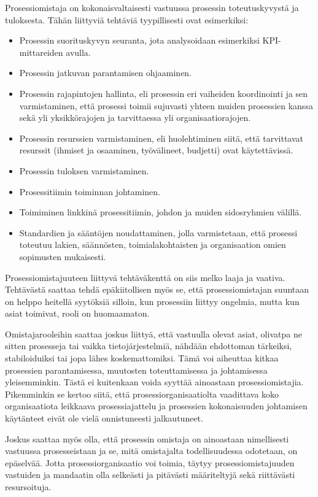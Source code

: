 \documentclass[
  finnish,
  letterpaper,
  DIV=11,
  numbers=noendperiod,
  oneside]{scrreprt}
\providecommand{\tightlist}{%
  \setlength{\itemsep}{0pt}\setlength{\parskip}{0pt}}
\begin{document}
Prosessiomistaja on kokonaisvaltaisesti vastuussa prosessin
toteutuskyvystä ja tuloksesta. Tähän liittyviä tehtäviä tyypillisesti
ovat esimerkiksi:

\begin{itemize}
\tightlist
\item
  Prosessin suorituskyvyn seuranta, jota analysoidaan esimerkiksi
  KPI-mittareiden avulla.
\item
  Prosessin jatkuvan parantamisen ohjaaminen.
\item
  Prosessin rajapintojen hallinta, eli prosessin eri vaiheiden
  koordinointi ja sen varmistaminen, että prosessi toimii sujuvasti
  yhteen muiden prosessien kanssa sekä yli yksikkörajojen ja
  tarvittaessa yli organisaatiorajojen.
\item
  Prosessin resurssien varmistaminen, eli huolehtiminen siitä, että
  tarvittavat resurssit (ihmiset ja osaaminen, työvälineet, budjetti)
  ovat käytettävissä.
\item
  Prosessin tuloksen varmistaminen.
\item
  Prosessitiimin toiminnan johtaminen.
\item
  Toimiminen linkkinä prosessitiimin, johdon ja muiden sidosryhmien
  välillä.
\item
  Standardien ja sääntöjen noudattaminen, jolla varmistetaan, että
  prosessi toteutuu lakien, säännösten, toimialakohtaisten ja
  organisaation omien sopimusten mukaisesti.
\end{itemize}

Prosessiomistajuuteen liittyvä tehtäväkenttä on siis melko laaja ja
vaativa. Tehtävästä saattaa tehdä epäkiitollisen myös se, että
prosessiomistajan suuntaan on helppo heitellä syytöksiä silloin, kun
prosessiin liittyy ongelmia, mutta kun asiat toimivat, rooli on
huomaamaton.

Omistajarooleihin saattaa joskus liittyä, että vastuulla olevat asiat,
olivatpa ne sitten prosesseja tai vaikka tietojärjestelmiä, nähdään
ehdottoman tärkeiksi, stabiloiduiksi tai jopa lähes koskemattomiksi.
Tämä voi aiheuttaa kitkaa prosessien parantamisessa, muutosten
toteuttamisessa ja johtamisessa yleisemminkin. Tästä ei kuitenkaan voida
syyttää ainoastaan prosessiomistajia. Pikemminkin se kertoo siitä, että
prosessiorganisaatiolta vaadittava koko organisaatiota leikkaava
prosessiajattelu ja prosessien kokonaisuuden johtamisen käytänteet eivät
ole vielä onnistuneesti jalkautuneet.

Joskus saattaa myös olla, että prosessin omistaja on ainoastaan
nimellisesti vastuussa prosesseistaan ja se, mitä omistajalta
todellisuudessa odotetaan, on epäselvää. Jotta prosessiorganisaatio voi
toimia, täytyy prosessiomistajuuden vastuiden ja mandaatin olla
selkeästi ja pitävästi määriteltyjä sekä riittävästi resursoituja.
\end{document}
